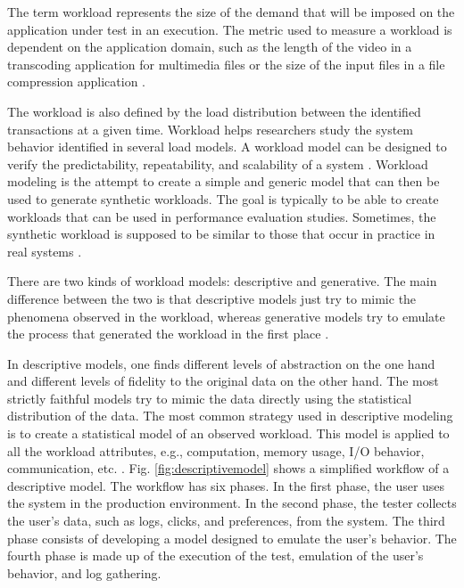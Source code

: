 \documentclass[espaco=umemeio,chapter=TITLE,twoside,openright]{abnt}
\begin{document}
The term workload represents the size of the demand that will be imposed on the application under test in an execution. The metric used to measure a workload is dependent on the application domain, such as the length of the video in a transcoding application for multimedia files or the size of the input files in a file compression application \cite{Feitelson2013} \cite{Molyneaux2009} \cite{Goncalves2014}.

The workload is also defined by the load distribution between the identified transactions at a given time. Workload helps researchers study the system behavior identified in several load models. A workload model can be designed to verify the predictability, repeatability, and scalability of a system \cite{Feitelson2013} \cite{Molyneaux2009}. Workload modeling is the attempt to create a simple and generic model that can then be used to generate synthetic workloads. The goal is typically to be able to create workloads that can be used in performance evaluation studies. Sometimes, the synthetic workload is supposed to be similar to those that occur in practice in real systems \cite{Feitelson2013} \cite{Molyneaux2009}.

There are two kinds of workload models: descriptive and generative. The main difference between the two is that descriptive models just try to mimic the phenomena observed in the workload, whereas generative models try to emulate the process that generated the workload in the first place \cite{Feitelson2013}.

In descriptive models, one finds different levels of abstraction on the one hand and different levels of fidelity to the original data on the other hand. The most strictly faithful models try to mimic the data directly using the statistical distribution of the data. The most common strategy used in descriptive modeling is to create a statistical model of an observed workload. This model is applied to all the workload attributes, e.g., computation, memory usage, I/O behavior, communication, etc. \cite{Feitelson2013}. Fig. \ref{fig:descriptivemodel} shows a simplified workflow of a descriptive model. The workflow has six phases. In the first phase, the user uses the system in the production environment. In the second phase, the tester collects the user's data, such as logs, clicks, and preferences, from the system. The third phase consists of developing a model designed to emulate the user's behavior. The fourth phase is made up of the execution of the test, emulation of the user's behavior, and log gathering.
\end{document}

